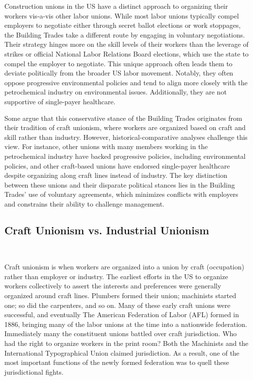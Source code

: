 Construction unions in the US have a distinct approach to organizing their workers vis-a-vis other labor unions. While most labor unions typically compel employers to negotiate either through secret ballot elections or work stoppages, the Building Trades take a different route by engaging in voluntary negotiations. Their strategy hinges more on the skill levels of their workers than the leverage of strikes or official National Labor Relations Board elections, which use the state to compel the employer to negotiate. This unique approach often leads them to deviate politically from the broader US labor movement. Notably, they often oppose progressive environmental policies and tend to align more closely with the petrochemical industry on environmental issues. Additionally, they are not supportive of single-payer healthcare.

Some argue that this conservative stance of the Building Trades originates from their tradition of craft unionism, where workers are organized based on craft and skill rather than industry. However, historical-comparative analyses challenge this view. For instance, other unions with many members working in the petrochemical industry have backed progressive policies, including environmental policies, and other craft-based unions have endorsed single-payer healthcare despite organizing along craft lines instead of industry. The key distinction between these unions and their disparate political stances lies in the Building Trades' use of voluntary agreements, which minimizes conflicts with employers and constrains their ability to challenge management.


\subsection{Craft Unionism vs. Industrial Unionism} \

Craft unionism is when workers are organized into a union by craft (occupation) rather than employer or industry. The earliest efforts in the US to organize workers collectively to assert the interests and preferences were generally organized around craft lines. Plumbers formed their union; machinists started one; so did the carpenters, and so on. Many of these early craft unions were successful, and eventually The American Federation of Labor (AFL) formed in 1886, bringing many of the labor unions at the time into a nationwide federation. Immediately many the constituent unions battled over craft jurisdiction. Who had the right to organize workers in the print room? Both the Machinists and the International Typographical Union claimed jurisdiction. As a result, one of the most important functions of the newly formed federation was to quell these jurisdictional fights.

